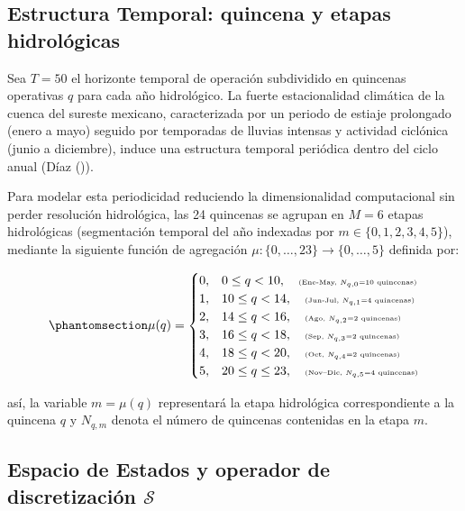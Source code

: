 \documentclass[
  spanish,
  letterpaper,
]{scrreprt}
\theoremstyle{definition}
\theoremstyle{remark}
\begin{document}
\subsection{Estructura Temporal: quincena y etapas
hidrológicas}\label{estructura-temporal-quincena-y-etapas-hidroluxf3gicas}

Sea \(T = 50\) el horizonte temporal de operación subdividido en
quincenas operativas \(q\) para cada año hidrológico. La fuerte
estacionalidad climática de la cuenca del sureste mexicano,
caracterizada por un periodo de estiaje prolongado (enero a mayo)
seguido por temporadas de lluvias intensas y actividad ciclónica (junio
a diciembre), induce una estructura temporal periódica dentro del ciclo
anual (Díaz ()).

Para modelar esta periodicidad reduciendo la dimensionalidad
computacional sin perder resolución hidrológica, las 24 quincenas se
agrupan en \(M = 6\) etapas hidrológicas (segmentación temporal del año
indexadas por \(m \in \{0,1,2,3,4,5\}\)), mediante la siguiente función
de agregación \(\mu : \{0, \dots, 23\} \to \{0, \dots, 5\}\) definida
por:

\begin{equation}\protect\phantomsection\label{eq-etapas}{\mu(q) = \begin{cases} 0, & 0 \leq q < 10, \quad {\scriptscriptstyle (\text{Ene-May, } N_{q,0} = 10 \text{ quincenas})} \\ 1, & 10 \leq q < 14, \quad {\scriptscriptstyle (\text{Jun-Jul, } N_{q,1} = 4 \text{ quincenas})} \\ 2, & 14 \leq q < 16, \quad {\scriptscriptstyle (\text{Ago, } N_{q,2} = 2 \text{ quincenas})} \\ 3, & 16 \leq q < 18, \quad {\scriptscriptstyle (\text{Sep, } N_{q,3} = 2 \text{ quincenas})} \\ 4, & 18 \leq q < 20, \quad {\scriptscriptstyle (\text{Oct, } N_{q,4} = 2 \text{ quincenas})} \\ 5, & 20 \leq q \leq 23, \quad {\scriptscriptstyle (\text{Nov--Dic, } N_{q,5} = 4 \text{ quincenas})} \end{cases}}\end{equation}

así, la variable \(m = \mu(q)\) representará la etapa hidrológica
correspondiente a la quincena \(q\) y \(N_{q,m}\) denota el número de
quincenas contenidas en la etapa \(m\).

\subsection{\texorpdfstring{Espacio de Estados y operador de
discretización
\(\mathcal{S}\)}{Espacio de Estados y operador de discretización \textbackslash mathcal\{S\}}}\label{espacio-de-estados-y-operador-de-discretizaciuxf3n-mathcals}
\end{document}
